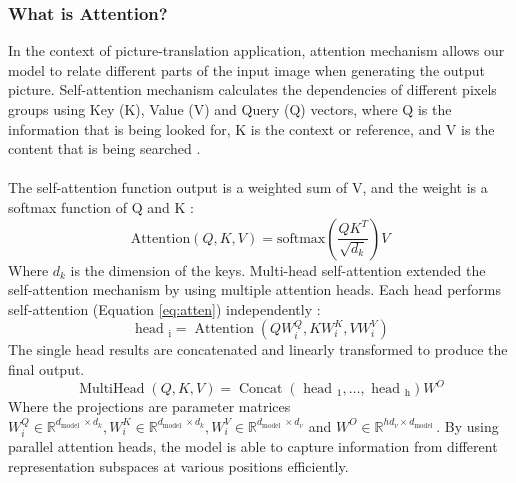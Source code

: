 \subsubsection{What is Attention?}
In the context of picture-translation application, attention mechanism allows our model to relate different parts of the input image when generating the output picture. Self-attention mechanism calculates the dependencies of different pixels groups using Key (K), Value (V) and Query (Q) vectors, where Q is the information that is being looked for, K is the context or reference, and V is the content that is being searched \cite{nabil2021unpacking}. 
\\\\
The self-attention function output is a weighted sum of V, and the weight is a softmax function of Q and K \cite{vaswani2017attention}:
\begin{equation}
	\text{Attention}(Q,K,V)=\text{softmax}(\frac{Q K^T}{\sqrt{d_k}}) V
	\label{eq:atten}
\end{equation}
\noindent Where $d_k$ is the dimension of the keys. Multi-head self-attention extended the self-attention mechanism by using multiple attention heads. Each head performs self-attention (Equation \ref{eq:atten}) independently \cite{vaswani2017attention}: 
\begin{equation}
	\text { head }_{\mathrm{i}}=\operatorname{Attention}\left(Q W_i^Q, K W_i^K, V W_i^V\right)
	\label{eq:head}
\end{equation}
\noindent The single head results are concatenated and linearly transformed to produce the final output. 
\begin{equation}
	\operatorname{MultiHead}(Q, K, V)=\operatorname{Concat}\left(\text { head }_1, \ldots, \text { head }_{\mathrm{h}}\right) W^O
	\label{eq:multihead}
\end{equation}
\noindent Where the projections are parameter matrices $W_i^Q \in \mathbb{R}^{d_{\text {model }} \times d_k}, W_i^K \in \mathbb{R}^{d_{\text {model }} \times d_k}, W_i^V \in \mathbb{R}^{d_{\text {model }} \times d_v}$ and $W^O \in \mathbb{R}^{h d_v \times d_{\text {model }}}$. By using parallel attention heads, the model is able to capture information from different representation subspaces at various positions efficiently. 

